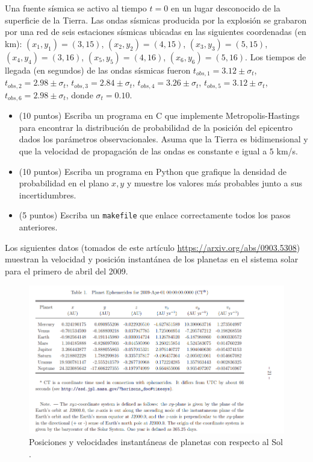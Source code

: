 \documentclass[11pt,letterpaper]{exam}
\begin{document}
\vspace{0.3cm}

\begin{questions}
Una fuente s\'ismica se activo al tiempo $t=0$ en un lugar
desconocido de la superficie de la Tierra. Las ondas s\'ismicas
producida por la explosi\'on se grabaron por una red de seis
estaciones s\'ismicas ubicadas en las siguientes coordenadas (en km):
$(x_1,y_1)=(3,15)$,  $(x_2,y_2)=(4,15)$,  $(x_3,y_3)=(5,15)$,
$(x_4,y_4)=(3,16)$,  $(x_5,y_5)=(4,16)$,  $(x_6,y_6)=(5,16)$. Los
tiempos de llegada (en segundos) de las ondas s\'ismicas fueron 
$t_{obs,1}=3.12\pm\sigma_t$, $t_{obs,2}=2.98\pm\sigma_t$,
$t_{obs,3}=2.84\pm\sigma_t$, $t_{obs,4}=3.26\pm\sigma_t$,
$t_{obs,5}=3.12\pm\sigma_t$, $t_{obs,6}=2.98\pm\sigma_t$, donde
$\sigma_t=0.10$. 
\begin{itemize}
\item (10 puntos) Escriba un programa en C que implemente
  Metropolis-Hastings para
  encontrar la distribuci\'on de probabilidad de la posici\'on del
  epicentro dados los par\'ametros observacionales. Asuma que la
  Tierra es bidimensional y que la velocidad de propagaci\'on de las
  ondas es constante e igual a $5$ km/s.
\item (10 puntos)  Escriba un programa en Python que grafique la
  densidad de probabilidad en el plano $x,y$ y 
  muestre los valores m\'as probables junto a sus
  incertidumbres. 
\item (5 puntos) Escriba un \verb"makefile" que enlace correctamente
  todos los pasos anteriores.

\end{itemize}

Los siguientes datos (tomados de este art\'iculo
\url{https://arxiv.org/abs/0903.5308}) muestran la velocidad y
posici\'on instant\'anea de los planetas en el sistema solar para el
primero de abril del 2009.

\begin{figure}[H]
  \centering
  \includegraphics[width=18cm]{planetas}
  \caption{\label{fig:gridplates} Posiciones y velocidades
    instant\'aneas de planetas con respecto al Sol .}
\end{figure}


\end{questions}
\end{document}
